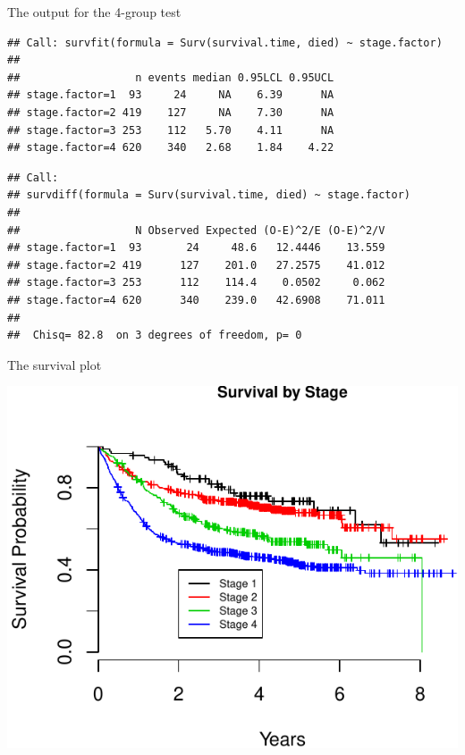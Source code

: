 \documentclass[ignorenonframetext,]{beamer}
\begin{document}
\begin{frame}[fragile]{%
\protect\hypertarget{the-output-for-the-4-group-test}{%
The output for the 4-group test}}

\footnotesize

\begin{verbatim}
## Call: survfit(formula = Surv(survival.time, died) ~ stage.factor)
## 
##                  n events median 0.95LCL 0.95UCL
## stage.factor=1  93     24     NA    6.39      NA
## stage.factor=2 419    127     NA    7.30      NA
## stage.factor=3 253    112   5.70    4.11      NA
## stage.factor=4 620    340   2.68    1.84    4.22
\end{verbatim}

\begin{verbatim}
## Call:
## survdiff(formula = Surv(survival.time, died) ~ stage.factor)
## 
##                  N Observed Expected (O-E)^2/E (O-E)^2/V
## stage.factor=1  93       24     48.6   12.4446    13.559
## stage.factor=2 419      127    201.0   27.2575    41.012
## stage.factor=3 253      112    114.4    0.0502     0.062
## stage.factor=4 620      340    239.0   42.6908    71.011
## 
##  Chisq= 82.8  on 3 degrees of freedom, p= 0
\end{verbatim}

\end{frame}

\begin{frame}{%
\protect\hypertarget{the-survival-plot}{%
The survival plot}}

\includegraphics{unit_03_significance_testing_files/figure-beamer/unnamed-chunk-16-1.pdf}

\end{frame}
\end{document}
